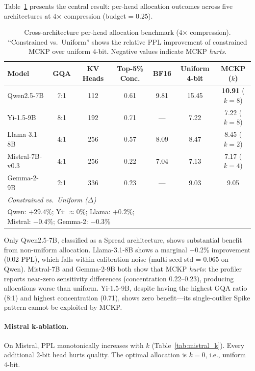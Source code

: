 \documentclass[11pt,a4paper]{article}
\begin{document}
Table~\ref{tab:cross_arch} presents the central result: per-head allocation outcomes across five architectures at 4$\times$ compression (budget = 0.25).

\begin{table}[h]
\centering
\caption{Cross-architecture per-head allocation benchmark (4$\times$ compression). ``Constrained vs.\ Uniform'' shows the relative PPL improvement of constrained MCKP over uniform 4-bit. Negative values indicate MCKP \emph{hurts}.}
\label{tab:cross_arch}
\small
\begin{tabular}{lcccccc}
\toprule
Model & GQA & KV Heads & Top-5\% Conc. & BF16 & Uniform 4-bit & MCKP ($k$) \\
\midrule
Qwen2.5-7B & 7:1 & 112 & 0.61 & 9.81 & 15.45 & \textbf{10.91} ($k\!=\!8$) \\
Yi-1.5-9B & 8:1 & 192 & 0.71 & --- & 7.22 & 7.22 ($k\!=\!8$) \\
Llama-3.1-8B & 4:1 & 256 & 0.57 & 8.09 & 8.47 & 8.45 ($k\!=\!2$) \\
Mistral-7B-v0.3 & 4:1 & 256 & 0.22 & 7.04 & 7.13 & 7.17 ($k\!=\!4$) \\
Gemma-2-9B & 2:1 & 336 & 0.23 & --- & 9.03 & 9.05 \\
\midrule
\multicolumn{4}{l}{\textit{Constrained vs.\ Uniform ($\Delta$)}} & & & \\
\multicolumn{4}{l}{Qwen: $+29.4\%$; Yi: $\approx 0\%$; Llama: $+0.2\%$; Mistral: $-0.4\%$; Gemma-2: $-0.3\%$} \\
\bottomrule
\end{tabular}
\end{table}

Only Qwen2.5-7B, classified as a Spread architecture, shows substantial benefit from non-uniform allocation.
Llama-3.1-8B shows a marginal +0.2\% improvement (0.02 PPL), which falls within calibration noise (multi-seed std = 0.065 on Qwen).
Mistral-7B and Gemma-2-9B both show that MCKP \emph{hurts}: the profiler reports near-zero sensitivity differences (concentration 0.22--0.23), producing allocations worse than uniform.
Yi-1.5-9B, despite having the highest GQA ratio (8:1) and highest concentration (0.71), shows zero benefit---its single-outlier Spike pattern cannot be exploited by MCKP.

\paragraph{Mistral k-ablation.}
On Mistral, PPL monotonically increases with $k$ (Table~\ref{tab:mistral_k}). Every additional 2-bit head hurts quality. The optimal allocation is $k\!=\!0$, i.e., uniform 4-bit.
\end{document}
